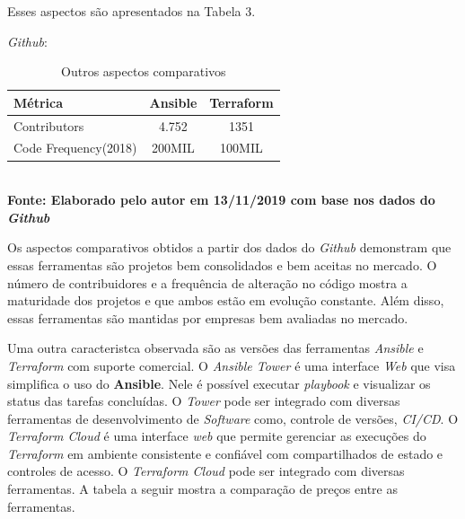 Esses aspectos são apresentados na Tabela 3.

 \textit{Github}: 
   \begin{table}[ht]
	\centering
	\caption{\hspace{0.1cm} Outros aspectos comparativos}
	\vspace{-0.3cm} %
	\label{tab:tabela3}
	\begin{tabular}{l|c|c}
  \hline
    \textbf{Métrica}	& \textbf{Ansible} & \textbf{Terraform} \\
    \hline
  Contributors & 4.752  & 1351\\
  Code Frequency(2018)  & 200MIL  &   100MIL  \\
     \hline
 \end{tabular}
 	\vspace{.1cm}  %
	\small
	{\footnotesize\\ \textbf{Fonte: Elaborado pelo autor em 13/11/2019 com base nos dados do \textit{Github}}}
\end{table}

Os aspectos comparativos obtidos a partir dos dados do \textit{Github} demonstram que essas ferramentas são projetos bem consolidados e bem aceitas no mercado. O número de contribuidores e a frequência de alteração no código mostra a maturidade dos projetos e que ambos estão em evolução constante. Além disso, essas ferramentas são mantidas por empresas bem avaliadas no mercado.  

Uma outra caracteristca observada são as versões das ferramentas \textit{Ansible} e \textit{Terraform} com suporte comercial. O \textit{Ansible Tower} é uma interface \textit{Web} que visa simplifica o uso do \textbf{Ansible}. Nele é possível executar \textit{playbook} e visualizar os status das tarefas concluídas. O \textit{Tower} pode ser integrado com diversas ferramentas de desenvolvimento de \textit{Software} como, controle de versões, \textit{CI/CD}. O \textit{Terraform Cloud} é uma interface \textit{web} que permite gerenciar as execuções do \textit{Terraform} em ambiente consistente e confiável com compartilhados de estado e controles de acesso. O \textit{Terraform Cloud} pode ser integrado com diversas ferramentas.  A tabela a seguir mostra a comparação de preços entre as ferramentas. 

